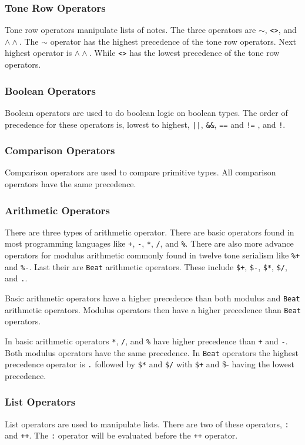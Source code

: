 \subsubsection{Tone Row Operators}
Tone row operators manipulate lists of notes. 
The three operators are $\sim$, \texttt{<>}, and $\wedge\wedge$. 
The $\sim$ operator has the highest precedence of the tone row 
operators. Next highest operator is $\wedge\wedge$. While \texttt{<>} 
has the lowest precedence of the tone row operators. 
\subsubsection{Boolean Operators}
Boolean operators are used to do boolean logic on 
boolean types. The order of precedence for these 
operators is, lowest to highest, \texttt{||}, 
\texttt{\&\&}, \texttt{==} and \texttt{!=} , and \texttt{!}. 
\subsubsection{Comparison Operators}
Comparison operators are used to compare primitive types. 
All comparison operators have the same precedence. 
\subsubsection{Arithmetic Operators}
\label{Arithmetic Operators}
There are three types of arithmetic operator. There are 
basic operators found in most programming languages like 
\texttt{+}, \texttt{-}, \texttt{*}, \texttt{/}, and \texttt{\%}. 
There are also more advance operators for modulus arithmetic commonly 
found in twelve tone serialism like \texttt{\%+} and \texttt{\%-}. 
Last their are \texttt{Beat} arithmetic operators. 
These include \texttt{\$+}, \texttt{\$-}, \texttt{\$*}, \texttt{\$/}, 
and \texttt{.}. 

Basic arithmetic operators have a higher precedence than both
modulus and \texttt{Beat} arithmetic operators. Modulus operators 
then have a higher precedence than \texttt{Beat} operators. 

In basic arithmetic operators \texttt{*}, \texttt{/}, and \texttt{\%} 
have higher precedence than \texttt{+} and \texttt{-}. 
Both modulus operators have the same precedence. In \texttt{Beat} 
operators the highest precedence operator is \texttt{.} followed 
by \texttt{\$*} and \texttt{\$/} with \texttt{\$+} and {\$-} having 
the lowest precedence. 
\subsubsection{List Operators}
List operators are used to manipulate lists. 
There are two of these operators,
\texttt{:} and \texttt{++}. The \texttt{:} operator will be evaluated before the \texttt{++} operator. 

